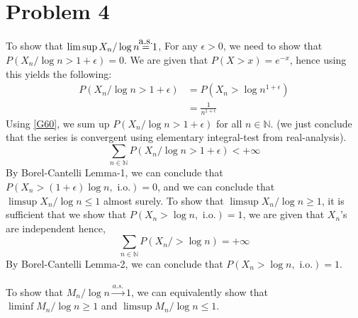\documentclass{article}
\newcommand\aseq{\stackrel{\mathclap{\normalfont\mbox{a.s.}}}{=}}
\newcommand{\converge}[1]{\xrightarrow{#1}}
\begin{document}
\section{Problem 4}
To show that $\limsup{X_n/\log{n}} \aseq 1$, 
For any $\epsilon > 0$, we need to show that $P(X_n/\log{n} > 1 + \epsilon) = 0$. We are given that $P(X > x) = e^{-x}$, hence using this yields the following:
\begin{equation}
    \label{G60}
    \begin{split}
        P(X_n/\log{n} > 1 + \epsilon) &= P(X_n > \log{n^{1+\epsilon}})\\
        &= \frac{1}{n^{1+\epsilon}}
    \end{split}
\end{equation}
Using \ref{G60}, we sum up $P(X_n/\log{n} > 1 + \epsilon)$ for all $n \in \mathbb{N}$. (we just conclude that the series is convergent using elementary integral-test from real-analysis).
\begin{equation*}
    \sum_{n \in \mathbb{N}} P(X_n/\log{n} > 1 + \epsilon) < +\infty
\end{equation*}
By Borel-Cantelli Lemma-1, we can conclude that $P\left(X_n > (1 + \epsilon) \log{n}, \,\, \text{i.o.} \right) = 0$, and we can conclude that $\limsup{X_n/\log{n}} \leq 1$ almost surely. To show that  $\limsup{X_n/\log{n}} \geq 1$, it is sufficient that we show that $P\left(X_n >  \log{n}, \, \, \text{i.o.}\right) = 1$, we are given that $X_n$'s are independent hence, 
\begin{equation*}
    \sum_{n \in \mathbb{N}} P(X_n/ >\log{n}) = +\infty
\end{equation*}
By Borel-Cantelli Lemma-2, we can conclude that $P\left(X_n >  \log{n}, \, \, \text{i.o.}\right) = 1$.\\\\
To show that $ {M_n/\log{n}} \converge{a.s.} 1$, we can equivalently show that $\liminf{{M_n/\log{n}}} \geq 1$ and $\limsup{{M_n/\log{n}}} \leq 1$. 
\end{document}

